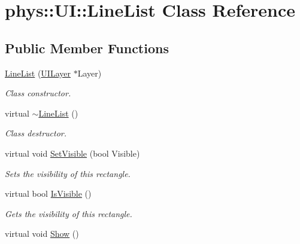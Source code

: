 \hypertarget{classphys_1_1UI_1_1LineList}{
\section{phys::UI::LineList Class Reference}
\label{d7/de8/classphys_1_1UI_1_1LineList}
}
\subsection*{Public Member Functions}
\begin{DoxyCompactItemize}
\item 
\hyperlink{classphys_1_1UI_1_1LineList_a0de86be9d9ecbd6f903cc15e6f44e135}{LineList} (\hyperlink{classphys_1_1UILayer}{UILayer} $\ast$Layer)
\begin{DoxyCompactList}\small\item\em Class constructor. \item\end{DoxyCompactList}\item 
\hypertarget{classphys_1_1UI_1_1LineList_ae962ca10492137ed85f7b66a79d4887e}{
virtual \hyperlink{classphys_1_1UI_1_1LineList_ae962ca10492137ed85f7b66a79d4887e}{$\sim$LineList} ()}
\label{d7/de8/classphys_1_1UI_1_1LineList_ae962ca10492137ed85f7b66a79d4887e}

\begin{DoxyCompactList}\small\item\em Class destructor. \item\end{DoxyCompactList}\item 
virtual void \hyperlink{classphys_1_1UI_1_1LineList_acecf11c133825233afd73d55ba9e4c1d}{SetVisible} (bool Visible)
\begin{DoxyCompactList}\small\item\em Sets the visibility of this rectangle. \item\end{DoxyCompactList}\item 
virtual bool \hyperlink{classphys_1_1UI_1_1LineList_af8c50f2e60b5a087cc9f3a280e10bd72}{IsVisible} ()
\begin{DoxyCompactList}\small\item\em Gets the visibility of this rectangle. \item\end{DoxyCompactList}\item 
\hypertarget{classphys_1_1UI_1_1LineList_ae725a770a9b938d01f1a161be050fcc5}{
virtual void \hyperlink{classphys_1_1UI_1_1LineList_ae725a770a9b938d01f1a161be050fcc5}{Show} ()}
\label{d7/de8/classphys_1_1UI_1_1LineList_ae725a770a9b938d01f1a161be050fcc5}


\end{DoxyCompactItemize}
